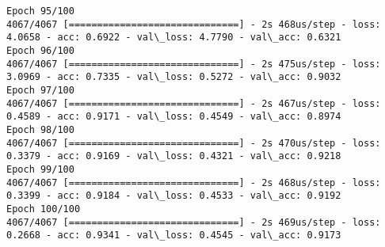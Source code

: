 \documentclass[11pt]{article}
\begin{document}
\begin{Verbatim}[commandchars=\\\{\}]
Epoch 95/100
4067/4067 [==============================] - 2s 468us/step - loss: 4.0658 - acc: 0.6922 - val\_loss: 4.7790 - val\_acc: 0.6321
Epoch 96/100
4067/4067 [==============================] - 2s 475us/step - loss: 3.0969 - acc: 0.7335 - val\_loss: 0.5272 - val\_acc: 0.9032
Epoch 97/100
4067/4067 [==============================] - 2s 467us/step - loss: 0.4589 - acc: 0.9171 - val\_loss: 0.4549 - val\_acc: 0.8974
Epoch 98/100
4067/4067 [==============================] - 2s 470us/step - loss: 0.3379 - acc: 0.9169 - val\_loss: 0.4321 - val\_acc: 0.9218
Epoch 99/100
4067/4067 [==============================] - 2s 468us/step - loss: 0.3399 - acc: 0.9184 - val\_loss: 0.4533 - val\_acc: 0.9192
Epoch 100/100
4067/4067 [==============================] - 2s 469us/step - loss: 0.2668 - acc: 0.9341 - val\_loss: 0.4545 - val\_acc: 0.9173

    \end{Verbatim}
\end{document}
